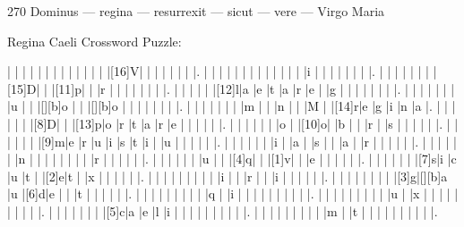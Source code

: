 \documentclass[12pt]{article}
\begin{document}
\pagestyle{fancy}
\fancyhf{}
\renewcommand{\headrulewidth}{0pt}
\renewcommand{\footrulewidth}{0pt}
\libertine
\renewcommand\PuzzleClueFont{\rm\normalsize}
\noindent\begin{rotate}{0}
\small
\end{rotate}
\hfill
\begin{rotate}{270}
	Dominus --- regina --- resurrexit --- sicut --- vere --- Virgo Maria
\end{rotate}
\begin{center}
  \huge{Regina Caeli Crossword Puzzle:}
\end{center}
\vspace{1.5cm}
\begin{Puzzle}{22}{24}
  |{}  |{}  |{}  |{}  |{}  |{}  |{}  |{}  |{}  |{}  |{}  |{}  |{}  |[16]V|{}  |{}  |{}  |{}  |{}  |{}  |{}  |.
  |{}  |{}  |{}  |{}  |{}  |{}  |{}  |{}  |{}  |{}  |{}  |{}  |{}  |i   |{}  |{}  |{}  |{}  |{}  |{}  |{}  |.
  |{}  |{}  |{}  |{}  |{}  |{}  |{}  |[15]D|{}  |{}  |[11]p|{}  |{}  |r   |{}  |{}  |{}  |{}  |{}  |{}  |{}  |.
  |{}  |{}  |{}  |{}  |{}  |[12]l|a   |e   |t   |a   |r   |e   |{}  |g   |{}  |{}  |{}  |{}  |{}  |{}  |{}  |.
	|{}  |{}  |{}  |{}  |{}  |{}  |{}  |u   |{}  |{}  |[][b]o   |{}  |{}  |[][b]o   |{}  |{}  |{}  |{}  |{}  |{}  |{}  |.
  |{}  |{}  |{}  |{}  |{}  |{}  |{}  |m   |{}  |{}  |n   |{}  |{}  |M   |{}  |[14]r|e   |g   |i   |n   |a   |.
  |{}  |{}  |{}  |{}  |{}  |{}  |[8]D|{}  |{}  |[13]p|o   |r   |t   |a   |r   |e   |{}  |{}  |{}  |{}  |{}  |.
  |{}  |{}  |{}  |{}  |{}  |{}  |o   |{}  |[10]o|{}  |b   |{}  |{}  |r   |{}  |s   |{}  |{}  |{}  |{}  |{}  |.
  |{}  |{}  |{}  |{}  |{}  |{}  |[9]m|e   |r   |u   |i   |s   |t   |i   |{}  |u   |{}  |{}  |{}  |{}  |{}  |.
  |{}  |{}  |{}  |{}  |{}  |{}  |i   |{}  |a   |{}  |s   |{}  |{}  |a   |{}  |r   |{}  |{}  |{}  |{}  |{}  |.
  |{}  |{}  |{}  |{}  |{}  |{}  |n   |{}  |{}  |{}  |{}  |{}  |{}  |{}  |{}  |r   |{}  |{}  |{}  |{}  |{}  |.
  |{}  |{}  |{}  |{}  |{}  |{}  |u   |{}  |{}  |[4]q|{}  |{}  |[1]v|{}  |{}  |e   |{}  |{}  |{}  |{}  |{}  |.
  |{}  |{}  |{}  |{}  |{}  |{}  |[7]s|i   |c   |u   |t   |{}  |[2]e|t   |{}  |x   |{}  |{}  |{}  |{}  |{}  |.
  |{}  |{}  |{}  |{}  |{}  |{}  |{}  |{}  |{}  |i   |{}  |{}  |r   |{}  |{}  |i   |{}  |{}  |{}  |{}  |{}  |.
	|{}  |{}  |{}  |{}  |{}  |{}  |{}  |{}  |[3]g|[][b]a   |u   |[6]d|e   |{}  |{}  |t   |{}  |{}  |{}  |{}  |{}  |.
  |{}  |{}  |{}  |{}  |{}  |{}  |{}  |{}  |{}  |q   |{}  |i   |{}  |{}  |{}  |{}  |{}  |{}  |{}  |{}  |{}  |.
  |{}  |{}  |{}  |{}  |{}  |{}  |{}  |{}  |{}  |u   |{}  |x   |{}  |{}  |{}  |{}  |{}  |{}  |{}  |{}  |{}  |.
  |{}  |{}  |{}  |{}  |{}  |{}  |{}  |[5]c|a   |e   |l   |i   |{}  |{}  |{}  |{}  |{}  |{}  |{}  |{}  |{}  |.
  |{}  |{}  |{}  |{}  |{}  |{}  |{}  |{}  |{}  |m   |{}  |t   |{}  |{}  |{}  |{}  |{}  |{}  |{}  |{}  |{}  |.
\end{Puzzle}
\end{document}
